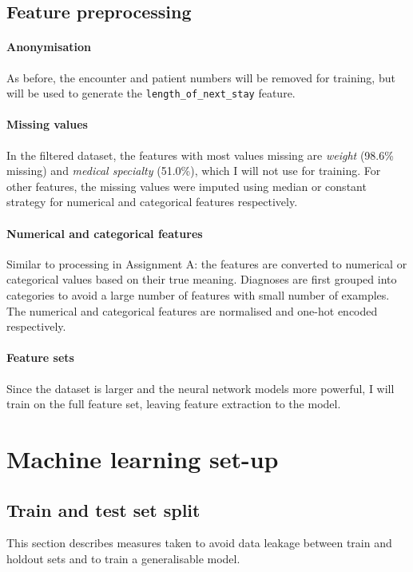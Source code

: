 \documentclass[10pt, twocolumn]{article}
\begin{document}
\subsection{Feature preprocessing}
\paragraph{Anonymisation} As before, the encounter and patient numbers will be removed for training, but will be used to generate the \texttt{length\_of\_next\_stay} feature.

\paragraph{Missing values} In the filtered dataset, the features with most values missing are \textit{weight} (98.6\% missing) and \textit{medical specialty} (51.0\%), which I will not use for training. For other features, the missing values were imputed using median or constant strategy for numerical and categorical features respectively.

\paragraph{Numerical and categorical features} Similar to processing in Assignment A: the features are converted to numerical or categorical values based on their true meaning. Diagnoses are first grouped into categories to avoid a large number of features with small number of examples. The numerical and categorical features are normalised and one-hot encoded respectively.

\paragraph{Feature sets} Since the dataset is larger and the neural network models more powerful, I will train on the full feature set, leaving feature extraction to the model.

\section{Machine learning set-up}

\subsection{Train and test set split}
This section describes measures taken to avoid data leakage between train and holdout sets and to train a generalisable model.
\end{document}
